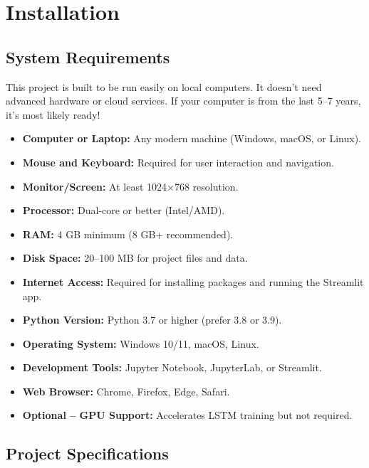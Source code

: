 %
%

\chapter{Installation}

\section{System Requirements}

This project is built to be run easily on local computers. It doesn’t need advanced hardware or cloud services. If your computer is from the last 5–7 years, it’s most likely ready!

\begin{itemize}
	\item \textbf{Computer or Laptop:} Any modern machine (Windows, macOS, or Linux).
	\item \textbf{Mouse and Keyboard:} Required for user interaction and navigation.
	\item \textbf{Monitor/Screen:} At least 1024×768 resolution.
	\item \textbf{Processor:} Dual-core or better (Intel/AMD).
	\item \textbf{RAM:} 4 GB minimum (8 GB+ recommended).
	\item \textbf{Disk Space:} 20–100 MB for project files and data.
	\item \textbf{Internet Access:} Required for installing packages and running the Streamlit app.
	\item \textbf{Python Version:} Python 3.7 or higher (prefer 3.8 or 3.9).
	\item \textbf{Operating System:} Windows 10/11, macOS, Linux.
	\item \textbf{Development Tools:} Jupyter Notebook, JupyterLab, or Streamlit.
	\item \textbf{Web Browser:} Chrome, Firefox, Edge, Safari.
	\item \textbf{Optional – GPU Support:} Accelerates LSTM training but not required.
\end{itemize}


\section{Project Specifications}

